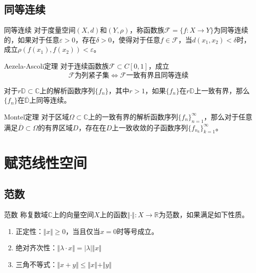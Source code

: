 \documentclass[lang = cn, scheme = chinese, thmcnt = section]{elegantbook}
\newcommand{\C}{\mathbb{C}}  		   %
\newcommand{\sub}{\subset}             %
\begin{document}
\subsection{同等连续}

\begin{definition}{同等连续}
	对于度量空间$(X,d)$和$(Y,\rho)$，称函数族$\mathscr{F}=\{ f:X\to Y \}$为同等连续的，如果对于任意$\varepsilon>0$，存在$\delta>0$，使得对于任意$f\in\mathscr{F}$，当$d(x_1,x_2)<\delta$时，成立$\rho(f(x_1),f(x_2))<\varepsilon$。
\end{definition}

\begin{theorem}{Aezela-Ascoli定理}
	对于连续函数族$\mathscr{F}\sub C[0,1]$，成立
	$$
	\mathscr{F}\text{为列紧子集}\iff \mathscr{F}\text{一致有界且同等连续}
	$$
\end{theorem}

\begin{lemma}
	对于$r\mathbb{D}\sub\C$上的解析函数序列$\{f_n\}$，其中$r>1$，如果$\{f_n\}$在$r\mathbb{D}$上一致有界，那么$\{f_n\}$在$\overline{\mathbb{D}}$上同等连续。
\end{lemma}

\begin{theorem}{Montel定理}
	对于区域$\Omega\sub\C$上的一致有界的解析函数序列$\{ f_n \}_{n=1}^{\infty}$，那么对于任意满足$\overline{D}\sub\Omega$的有界区域$D$，存在在$D$上一致收敛的子函数序列$\{ f_{n_k} \}_{k=1}^{\infty}$。
\end{theorem}

\section{赋范线性空间}

\subsection{范数}

\begin{definition}{范数}
	称复数域$\mathbb{C}$上的向量空间$X$上的函数$\Vert \cdot \Vert:X\to\mathbb{R}$为范数，如果满足如下性质。
	\begin{enumerate}
		\item 正定性：$\Vert x \Vert\ge 0$，当且仅当$x=0$时等号成立。
		\item 绝对齐次性：$\Vert\lambda\cdot x\Vert=|\lambda|\Vert x \Vert$
		\item 三角不等式：$\Vert x+y \Vert\le\Vert x \Vert+\Vert y \Vert$
	\end{enumerate}
\end{definition}
\end{document}
